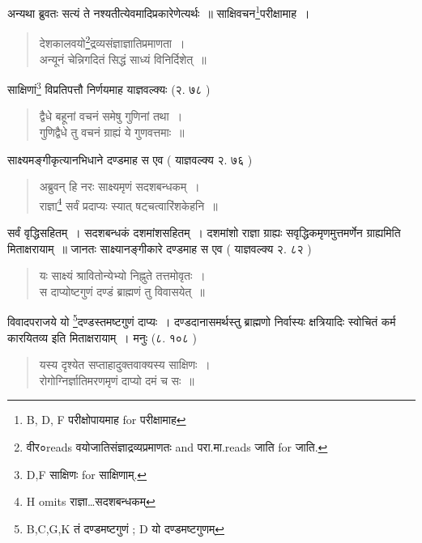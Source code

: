 \documentclass[11pt, openany]{book}
\begin{document}
\newpage 
{}

\noindent
अन्यथा ब्रुवतः सत्यं ते नश्यतीत्येवमादिप्रकारेणेत्यर्थः~॥ साक्षिवचन\renewcommand{\thefootnote}{1}\footnote{B, D, F परीक्षोपायमाह for परीक्षामाह}परीक्षामाह~।

\begin{quote}
{\vy देशकालवयो\renewcommand{\thefootnote}{2}\footnote{वीर०reads वयोजातिसंज्ञाद्रव्यप्रमाणतः and परा.मा.reads जाति for जाति.}द्रव्यसंज्ञाज्ञातिप्रमाणता~।\\
अन्यूनं चेन्निगदितं सिद्धं साध्यं विनिर्दिशेत्~॥}
\end{quote}

साक्षिणां\renewcommand{\thefootnote}{3}\footnote{D,F साक्षिणः for साक्षिणाम्.} विप्रतिपत्तौ निर्णयमाह याज्ञवल्क्यः (२. ७८ )

\begin{quote}
{\vy द्वैधे बहूनां वचनं समेषु गुणिनां तथा~।\\
गुणिद्वैधे तु वचनं ग्राह्यं ये गुणवत्तमाः~॥}
\end{quote}

साक्ष्यमङ्गीकृत्यानभिधाने दण्डमाह स एव ( याज्ञवल्क्य २. ७६ )

\begin{quote}
{\vy अब्रुवन् हि नरः साक्ष्यमृणं सदशबन्धकम्~।\\
राज्ञा\renewcommand{\thefootnote}{4}\footnote{H omits राज्ञा\ldots सदशबन्धकम्} सर्वं प्रदाप्यः स्यात् षट्चत्वारिंशकेहनि~॥}
\end{quote}

सर्वं वृद्धिसहितम्~। सदशबन्धकं दशमांशसहितम्~। दशमांशो राज्ञा ग्राह्यः सवृद्धिकमृणमुत्तमर्णेन ग्राह्यमिति मिताक्षरायाम्~॥ जानतः साक्ष्यानङ्गीकारे दण्डमाह स एव ( याज्ञवल्क्य २. ८२ )

\begin{quote}
{\vy यः साक्ष्यं श्रावितोन्येभ्यो निह्नुते तत्तमोवृतः~।\\
स दाप्योष्टगुणं दण्डं ब्राह्मणं तु विवासयेत्~॥}
\end{quote}

विवादपराजये यो \renewcommand{\thefootnote}{5}\footnote{B,C,G,K तं दण्डमष्टगुणं ; D यो दण्डमष्टगुणम्}दण्डस्तमष्टगुणं दाप्यः~। दण्डदानासमर्थस्तु ब्राह्मणो निर्वास्यः क्षत्रियादिः स्वोचितं कर्म कारयितव्य इति मिताक्षरायाम्~। मनुः (८. १०८ )

\begin{quote}
{\vy यस्य दृश्येत सप्ताहादुक्तवाक्यस्य साक्षिणः~।\\
रोगोग्निर्ज्ञातिमरणमृणं दाप्यो दमं च सः~॥}
\end{quote}
\end{document}
